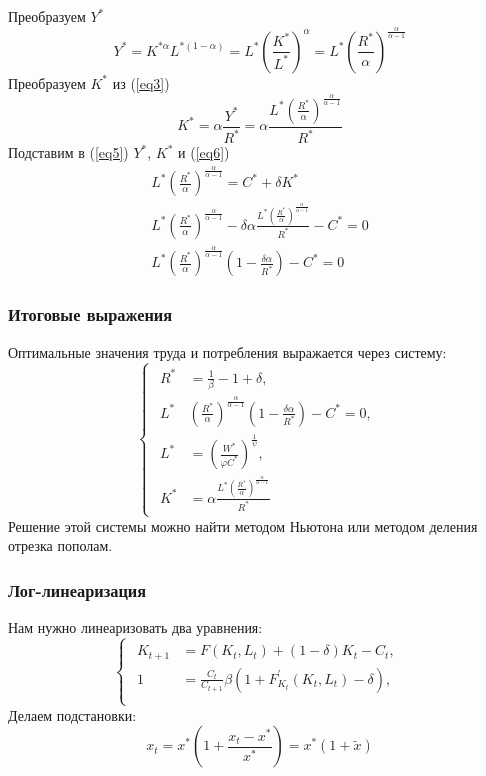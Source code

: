 \documentclass[a4paper,12pt]{article}
\begin{document}
{Преобразуем $Y^*$
\begin{equation*}
    Y^* = K^{* \alpha}L^{*(1-\alpha)} = L^* \left( \frac{K^*}{L^*}\right)^{\alpha} = L^* \left( \frac{R^*}{\alpha}\right)^{\frac{\alpha}{\alpha - 1}}
\end{equation*}
Преобразуем $K^*$ из (\ref{eq3})
\begin{equation*}
    K^* = \alpha \frac{Y^*}{R^*} = \alpha \frac{L^* \left( \frac{R^*}{\alpha}\right)^{\frac{\alpha}{\alpha - 1}}}{R^*}
\end{equation*}
Подставим в (\ref{eq5}) $Y^*$, $K^*$ и (\ref{eq6})
\begin{align*}
    L^* \left( \frac{R^*}{\alpha}\right)^{\frac{\alpha}{\alpha - 1}} = C^* + \delta K^* \\
    L^* \left( \frac{R^*}{\alpha}\right)^{\frac{\alpha}{\alpha - 1}} - \delta \alpha \frac{L^* \left( \frac{R^*}{\alpha}\right)^{\frac{\alpha}{\alpha - 1}}}{R^*} - C^* = 0 \\
    L^* \left( \frac{R^*}{\alpha}\right)^{\frac{\alpha}{\alpha - 1}} \left(1 - \frac{\delta \alpha}{R^*} \right) - C^* = 0
\end{align*}
\subsubsection{Итоговые выражения}
Оптимальные значения труда и потребления выражается через систему:
\begin{equation}
    \begin{cases}
    \begin{alignedat}{2}
    R^* &= \frac{1}{\beta} - 1 + \delta, \\
    L^* &\left( \frac{R^*}{\alpha}\right)^{\frac{\alpha}{\alpha - 1}} \left(1 - \frac{\delta \alpha}{R^*} \right) - C^* = 0, \\
    L^* &= \left( \frac{W^*}{\varphi C^*} \right)^{\frac{1}{\psi}},  \\
    K^* &= \alpha \frac{L^* \left( \frac{R^*}{\alpha}\right)^{\frac{\alpha}{\alpha - 1}}}{R^*}
    \end{alignedat}
    \end{cases}
    \label{eq:system_stationary_2}
\end{equation}
Решение этой системы можно найти методом Ньютона или методом деления отрезка пополам.
\subsubsection{Лог-линеаризация}
Нам нужно линеаризовать два уравнения:
\begin{equation}
    \begin{cases}
    \begin{alignedat}{2}
    K_{t+1} &= F(K_t,L_t) + (1 - \delta)K_t - C_t, \\
    1 &= \frac{C_t}{C_{t+1}} \beta \left( 1 + F^{'}_{K_t}(K_t,L_t) - \delta\right), \\
    \end{alignedat}
    \end{cases}
    \label{eq:system_dynamic}
\end{equation}
Делаем подстановки:
\[x_t = x^* \left( 1 + \frac{x_t - x^*}{x^*} \right) = x^*(1 + \tilde{x})\]

}
\end{document}
